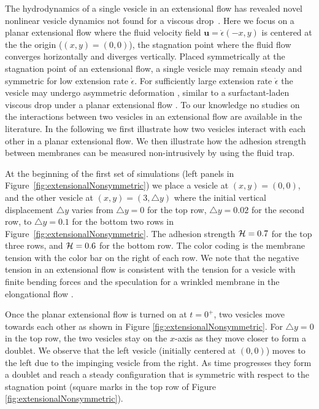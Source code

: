 \documentclass[prf,superscriptaddress,showkeys,longbibliography]{revtex4-1}
\newcommand{\uu}{\mathbf{u}}
\begin{document}
The hydrodynamics of a single vesicle in an extensional flow has
revealed novel nonlinear vesicle dynamics not found for a viscous
drop~\cite{KantslerSegreSteinberg2008_PRL, ZhaoShaqfeh2013_JFM,
Narsimhan2014_JFM, DahlNarsimhanGouveia2016_SoftMatt}.  Here we focus on a
planar extensional flow  where the fluid velocity field $\uu=\dot\epsilon(-x,y)$ is centered at the 
the origin ($(x,y)=(0,0)$), the stagnation point where the fluid flow converges horizontally and diverges vertically.
Placed symmetrically at the stagnation point of an extensional flow,
a single vesicle may remain steady and symmetric for low extension rate $\dot\epsilon$.
For sufficiently large extension rate $\dot\epsilon$ the vesicle may undergo asymmetric deformation \cite{KantslerSegreSteinberg2008_PRL,Narsimhan2014_JFM,DahlNarsimhanGouveia2016_SoftMatt}, 
similar to a surfactant-laden viscous drop under a planar extensional flow \cite{JanssenBoonAgterof1997_AIChE,HuPineLeal2000_PoF}.
To our knowledge no studies on the interactions between two vesicles in an extensional flow are available in the literature.
In the following we first illustrate how two vesicles interact with each other in a planar extensional flow. We then illustrate how the adhesion strength between membranes can be
measured non-intrusively by using the fluid trap.

At the beginning of the first set of simulations (left panels in Figure~\ref{fig:extensionalNonsymmetric})
we place a vesicle at $(x,y)=(0,0)$, 
and the other vesicle at $(x,y) = (3,\triangle y)$ where the initial vertical displacement $\triangle y$ varies from
$\triangle y=0$ for the top row, $\triangle y = 0.02$ for the second row, to
$\triangle y =0.1$ for the bottom two rows in Figure~\ref{fig:extensionalNonsymmetric}.
The adhesion strength ${\cal H} = 0.7$ for the top three rows, and ${\cal H} =0.6$ for the bottom row.
The color coding is the membrane tension with the color bar on the right of each row. We note that the negative tension in an
extensional flow is consistent with the tension for a vesicle with finite bending forces \cite{Narsimhan2014_JFM} and the
speculation for a wrinkled membrane in the elongational flow \cite{KantslerSegreSteinberg2007_PRL}.

Once the planar extensional flow is turned on at $t=0^+$, two vesicles move
towards each other  as shown in  Figure \ref{fig:extensionalNonsymmetric}.
For $\triangle y=0$ in the top row, the two vesicles stay on the $x$-axis as they move closer to 
form a doublet. We observe that the left vesicle (initially centered at $(0,0)$) moves to the left due to the impinging
vesicle from the right. As time progresses they form a doublet
and reach a steady configuration that is symmetric with respect to the stagnation point 
(square marks in the top row of Figure \ref{fig:extensionalNonsymmetric}).
\end{document}
